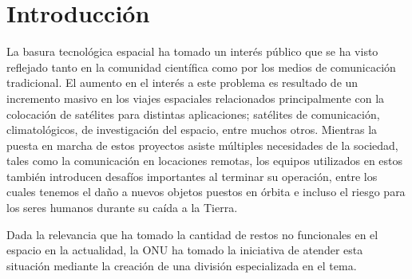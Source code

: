 \section*{Introducción}\label{Sec:Introduction}

La basura tecnológica espacial ha tomado un interés público que se ha visto reflejado tanto en la comunidad científica como por los medios de comunicación tradicional. El aumento en el interés a este problema es resultado de un incremento masivo en los viajes espaciales relacionados principalmente con la colocación de satélites para distintas aplicaciones; satélites de comunicación, climatológicos, de investigación del espacio, entre muchos otros. Mientras la puesta en marcha de estos proyectos asiste múltiples necesidades de la sociedad, tales como la comunicación en locaciones remotas, los equipos utilizados en estos también introducen desafíos importantes al terminar su operación, entre los cuales tenemos el daño a nuevos objetos puestos en órbita e incluso el riesgo para los seres humanos durante su caída a la Tierra.

Dada la relevancia que ha tomado la cantidad de restos no funcionales en el espacio en la actualidad, la ONU ha tomado la iniciativa de atender esta situación mediante la creación de una división especializada en el tema.
